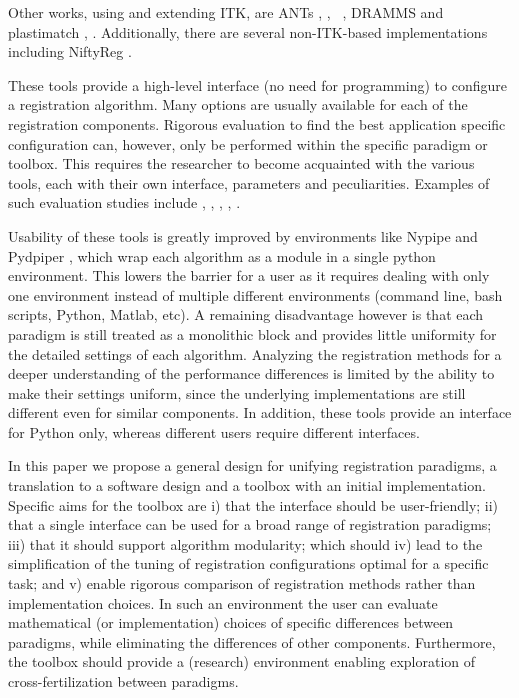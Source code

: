 Other works, using and extending ITK, are ANTs \cite{Ants}, \cite{Avants:SyN} \cite{Tustison:BSSyN}, \elastix\ \cite{elastix}, DRAMMS \cite{Ou:Dramms} and
plastimatch \cite{Sharp:plastimatch}, \cite{Shackleford:plastimatch}. 
Additionally, there are several non-ITK-based implementations including NiftyReg \cite{Modat:Niftyreg}.

These tools provide a
high-level interface (no need for programming) to configure a
registration algorithm. Many options are usually available for each
of the registration components. Rigorous evaluation to find the best
application specific configuration can, however, only be performed
within the specific paradigm or toolbox. This requires the
researcher to become acquainted with the various tools, each with
their own interface, parameters and peculiarities. Examples of such
evaluation studies include \cite{Kanai:Evaluation},
\cite{Murphy:Empire}, \cite{Klein:Evaluation},
\cite{Ou:Comparative}, 
\cite{Varadhan:Framework}.

Usability of these tools is greatly improved by environments like Nypipe \cite{Gorgolewski:Nipype} and Pydpiper \cite{Friedel:pydpiper}, which wrap each
algorithm as a module in a single python environment. This lowers
the barrier for a user as it requires dealing with only one
environment instead of multiple different environments (command
line, bash scripts, Python, Matlab, etc). A remaining disadvantage
however is that each paradigm is still treated as a monolithic block
and provides little uniformity for the detailed settings of each
algorithm. Analyzing the registration methods for a deeper
understanding of the performance differences is limited by the
ability to make their settings uniform, since the underlying
implementations are still different even for similar components. In
addition, these tools provide an interface for Python only, whereas
different users require different interfaces.

In this paper we propose a general design for unifying registration paradigms, a translation to a software design and a toolbox with an initial implementation.
Specific aims for the toolbox are i)
that the interface should be user-friendly; ii) that a single
interface can be used for a broad range of registration paradigms;
iii) that it should support algorithm modularity; which should iv)
lead to the simplification of the tuning of registration
configurations optimal for a specific task; and v) enable rigorous
comparison of registration methods rather than implementation
choices. In such an environment the user can evaluate mathematical
(or implementation) choices of specific differences between
paradigms, while eliminating the differences of other components.
Furthermore, the toolbox should provide a (research) environment
enabling exploration of cross-fertilization between paradigms.

